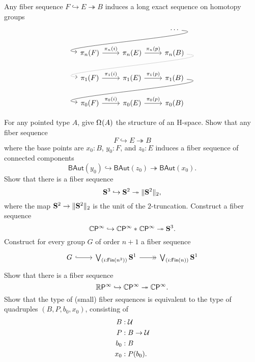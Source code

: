 \begin{thm}
Any fiber sequence $F\hookrightarrow E\twoheadrightarrow B$ induces a long exact sequence on homotopy groups
\begin{equation*}
\begin{tikzcd}
& & \cdots \arrow[out=355,in=175,dll] \\
\pi_n(F) \arrow[r,"\pi_n(i)"] & \pi_n(E) \arrow[r,"\pi_n(p)"] & \pi_n(B) \arrow[out=355,in=175,dll,densely dotted] \\
\pi_1(F) \arrow[r,"\pi_1(i)"] & \pi_1(E) \arrow[r,"\pi_1(p)"] & \pi_1(B) \arrow[out=355,in=175,dll] \\
\pi_0(F) \arrow[r,"\pi_0(i)"] & \pi_0(E) \arrow[r,"\pi_0(p)"] & \pi_0(B)
\end{tikzcd}
\end{equation*}
\end{thm}


\begin{exercises}
  \exercise For any pointed type $A$, give $\Omega^{}(A)$ the structure of an H-space.
  \exercise Show that any fiber sequence
\begin{equation*}
  F \hookrightarrow E \twoheadrightarrow B
\end{equation*}
where the base points are $x_0:B$, $y_0:F$, and $z_0:E$ induces a fiber sequence of connected components
\begin{equation*}
  \mathsf{BAut}(y_0) \hookrightarrow \mathsf{BAut}(z_0) \twoheadrightarrow \mathsf{BAut}(x_0).
\end{equation*}
  \exercise Show that there is a fiber sequence
\begin{equation*}
  \mathbf{S}^{3}\hookrightarrow\mathbf{S}^{2}\twoheadrightarrow\Vert \mathbf{S}^{2}\Vert_{2},
\end{equation*}
where the map $\mathbf{S}^{2}\to\Vert \mathbf{S}^{2}\Vert_{2}$ is the unit of the $2$-truncation.
  \exercise Construct a fiber sequence
  \begin{equation*}
    \mathbb{C}\mathsf{P}^{\infty}\hookrightarrow {\mathbb{C}\mathsf{P}^{\infty}}\ast_{}{\mathbb{C}\mathsf{P}^{\infty}} \twoheadrightarrow \mathbf{S}^{3}.
  \end{equation*}
  \exercise Construct for every group $G$ of order $n+1$ a fiber sequence
  \begin{equation*}
    \begin{tikzcd}
      G \arrow[r,hook] & \bigvee_{(i:\Fin(n^2))}\sphere{1}\arrow[r,->>] & \bigvee_{(i:\Fin(n))}\sphere{1}
    \end{tikzcd}
  \end{equation*}
  \exercise Show that there is a fiber sequence
\begin{equation*}
  \mathbb{R}\mathsf{P}^{\infty}\hookrightarrow\mathbb{C}\mathsf{P}^{\infty}\twoheadrightarrow\mathbb{C}\mathsf{P}^{\infty}.
\end{equation*}
\exercise Show that the type of (small) fiber sequences is equivalent to the type of quadruples $(B,P,b_0,x_0)$, consisting of
\begin{align*}
B & : \mathcal{U} \\
P & : B \to \mathcal{U} \\
b_0 & : B \\
x_0 & : P(b_0).
\end{align*}
\end{exercises}
